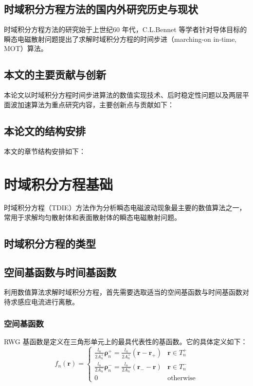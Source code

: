 \documentclass[promaster]{thesis-uestc}
\begin{document}
\section{时域积分方程方法的国内外研究历史与现状}
时域积分方程方法的研究始于上世纪60 年代，C.L.Bennet 等学者针对导体目标的瞬态电磁散射问题提出了求解时域积分方程的时间步进（marching-on in-time, MOT）算法。

\section{本文的主要贡献与创新}
本论文以时域积分方程时间步进算法的数值实现技术、后时稳定性问题以及两层平面波加速算法为重点研究内容，主要创新点与贡献如下：

\section{本论文的结构安排}
本文的章节结构安排如下：

\chapter{时域积分方程基础}
时域积分方程（TDIE）方法作为分析瞬态电磁波动现象最主要的数值算法之一，常用于求解均匀散射体和表面散射体的瞬态电磁散射问题。

\section{时域积分方程的类型}

\section{空间基函数与时间基函数}
利用数值算法求解时域积分方程，首先需要选取适当的空间基函数与时间基函数对待求感应电流进行离散。

\subsection{空间基函数}
RWG 基函数是定义在三角形单元上的最具代表性的基函数。它的具体定义如下：
\begin{equation}
f_n(\bm{r})=
\begin{cases}
\frac{l_n}{2A_n^+}\bm{\rho}_n^+=\frac{l_n}{2A_n^+}(\bm{r}-\bm{r}_+)&\bm{r}\in T_n^+\\
\frac{l_n}{2A_n^-}\bm{\rho}_n^-=\frac{l_n}{2A_n^-}(\bm{r}_--\bm{r})&\bm{r}\in T_n^-\\
0&\text{otherwise}
\end{cases}
\end{equation}
\end{document}
